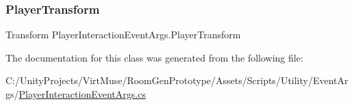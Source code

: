 \subsubsection{\texorpdfstring{Player\+Transform}{PlayerTransform}}
{\footnotesize\ttfamily Transform Player\+Interaction\+Event\+Args.\+Player\+Transform\hspace{0.3cm}{\ttfamily [get]}}



The documentation for this class was generated from the following file\+:\begin{DoxyCompactItemize}
\item 
C\+:/\+Unity\+Projects/\+Virt\+Muse/\+Room\+Gen\+Prototype/\+Assets/\+Scripts/\+Utility/\+Event\+Args/\mbox{\hyperlink{_player_interaction_event_args_8cs}{Player\+Interaction\+Event\+Args.\+cs}}\end{DoxyCompactItemize}
